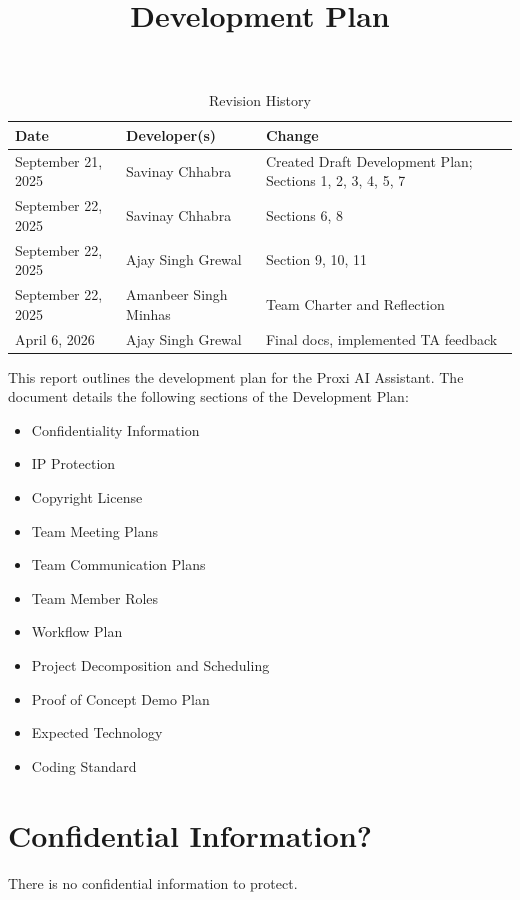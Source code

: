 \documentclass{article}
\title{Development Plan\\\progname}
\author{\authname}
\date{}
\begin{document}
\maketitle

\begin{table}[hp]
\caption{Revision History} \label{TblRevisionHistory}
\begin{tabularx}{\textwidth}{llX}
\toprule
\textbf{Date} & \textbf{Developer(s)} & \textbf{Change}\\
\midrule
September 21, 2025 & Savinay Chhabra  & Created Draft Development Plan; Sections 1, 2, 3, 4, 5, 7\\
September 22, 2025 & Savinay Chhabra  & Sections 6, 8\\ 
September 22, 2025 & Ajay Singh Grewal & Section 9, 10, 11\\
September 22, 2025 & Amanbeer Singh Minhas & Team Charter and Reflection\\
April 6, 2026 & Ajay Singh Grewal & Final docs, implemented TA feedback\\
\bottomrule
\end{tabularx}
\end{table}

\newpage{}
This report outlines the development plan for the Proxi AI Assistant. 
The document details the following sections of the Development Plan:
\begin{itemize}
  \item Confidentiality Information
  \item IP Protection
  \item Copyright License
  \item Team Meeting Plans
  \item Team Communication Plans
  \item Team Member Roles
  \item Workflow Plan
  \item Project Decomposition and Scheduling
  \item Proof of Concept Demo Plan
  \item Expected Technology
  \item Coding Standard
\end{itemize}

\section{Confidential Information?}

There is no confidential information to protect.
\end{document}
